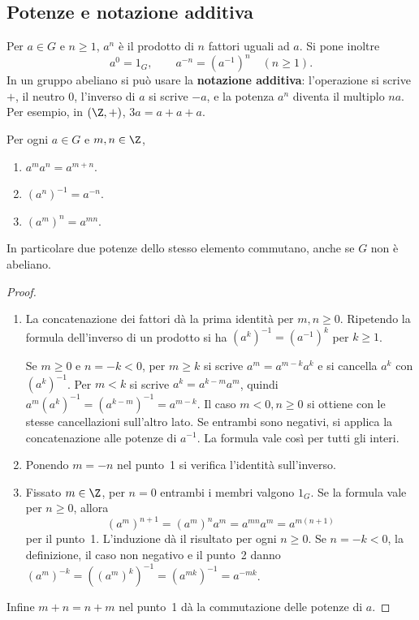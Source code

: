 \subsection{Potenze e notazione additiva}
\begin{definizione}
Per $a\in G$ e $n\ge1$, $a^n$ è il prodotto di $n$ fattori uguali ad $a$. Si pone inoltre
\[
a^0=1_G,\qquad a^{-n}=(a^{-1})^n\quad(n\ge1).
\]
In un gruppo abeliano si può usare la \textbf{notazione additiva}: l'operazione si scrive $+$, il neutro $0$, l'inverso di $a$ si scrive $-a$, e la potenza $a^n$ diventa il multiplo $na$. Per esempio, in $(\Z,+)$, $3a=a+a+a$.
\end{definizione}

\begin{proposizione}\label{prop:potenze-gruppo}
Per ogni $a\in G$ e $m,n\in\Z$,
\begin{enumerate}[label=\arabic*.]
\item $a^ma^n=a^{m+n}$.
\item $(a^n)^{-1}=a^{-n}$.
\item $(a^m)^n=a^{mn}$.
\end{enumerate}
In particolare due potenze dello stesso elemento commutano, anche se $G$ non è abeliano.
\end{proposizione}
\begin{proof}
\begin{enumerate}[label=\arabic*.]
\item La concatenazione dei fattori dà la prima identità per $m,n\ge0$. Ripetendo la formula dell'inverso di un prodotto si ha $(a^k)^{-1}=(a^{-1})^k$ per $k\ge1$.

Se $m\ge0$ e $n=-k<0$, per $m\ge k$ si scrive $a^m=a^{m-k}a^k$ e si cancella $a^k$ con $(a^k)^{-1}$. Per $m<k$ si scrive $a^k=a^{k-m}a^m$, quindi $a^m(a^k)^{-1}=(a^{k-m})^{-1}=a^{m-k}$. Il caso $m<0,n\ge0$ si ottiene con le stesse cancellazioni sull'altro lato. Se entrambi sono negativi, si applica la concatenazione alle potenze di $a^{-1}$. La formula vale così per tutti gli interi.
\item Ponendo $m=-n$ nel punto~1 si verifica l'identità sull'inverso.
\item Fissato $m\in\Z$, per $n=0$ entrambi i membri valgono $1_G$. Se la formula vale per $n\ge0$, allora
\[
(a^m)^{n+1}=(a^m)^na^m=a^{mn}a^m=a^{m(n+1)}
\]
per il punto~1. L'induzione dà il risultato per ogni $n\ge0$. Se $n=-k<0$, la definizione, il caso non negativo e il punto~2 danno $(a^m)^{-k}=((a^m)^k)^{-1}=(a^{mk})^{-1}=a^{-mk}$.
\end{enumerate}
Infine $m+n=n+m$ nel punto~1 dà la commutazione delle potenze di $a$.
\end{proof}

